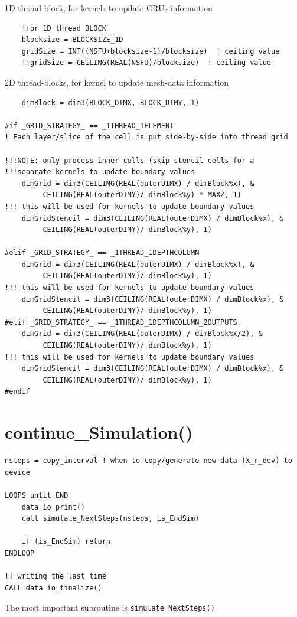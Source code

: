 1D thread-block, for kernels to update CRUs information
\begin{lstlisting}
    !for 1D thread BLOCK
    blocksize = BLOCKSIZE_1D
    gridSize = INT((NSFU+blocksize-1)/blocksize)  ! ceiling value
    !!gridSize = CEILING(REAL(NSFU)/blocksize)  ! ceiling value
\end{lstlisting}

2D thread-blocks, for kernel to update mesh-data information
\begin{lstlisting}
    dimBlock = dim3(BLOCK_DIMX, BLOCK_DIMY, 1)

#if _GRID_STRATEGY_ == _1THREAD_1ELEMENT
! Each layer/slice of the cell is put side-by-side into thread grid

!!!NOTE: only process inner cells (skip stencil cells for a
!!!separate kernels to update boundary values
    dimGrid = dim3(CEILING(REAL(outerDIMX) / dimBlock%x), & 
         CEILING(REAL(outerDIMY)/ dimBlock%y) * MAXZ, 1)
!!! this will be used for kernels to update boundary values
    dimGridStencil = dim3(CEILING(REAL(outerDIMX) / dimBlock%x), & 
         CEILING(REAL(outerDIMY)/ dimBlock%y), 1)
    
#elif _GRID_STRATEGY_ == _1THREAD_1DEPTHCOLUMN
    dimGrid = dim3(CEILING(REAL(outerDIMX) / dimBlock%x), & 
         CEILING(REAL(outerDIMY)/ dimBlock%y), 1)
!!! this will be used for kernels to update boundary values
    dimGridStencil = dim3(CEILING(REAL(outerDIMX) / dimBlock%x), & 
         CEILING(REAL(outerDIMY)/ dimBlock%y), 1)
#elif _GRID_STRATEGY_ == _1THREAD_1DEPTHCOLUMN_2OUTPUTS
    dimGrid = dim3(CEILING(REAL(outerDIMX) / dimBlock%x/2), & 
         CEILING(REAL(outerDIMY)/ dimBlock%y), 1)
!!! this will be used for kernels to update boundary values
    dimGridStencil = dim3(CEILING(REAL(outerDIMX) / dimBlock%x), & 
         CEILING(REAL(outerDIMY)/ dimBlock%y), 1)    
#endif    
\end{lstlisting}


\section{continue\_Simulation()}
\label{sec:continue_simulation}

\begin{lstlisting}
nsteps = copy_interval ! when to copy/generate new data (X_r_dev) to device

LOOPS until END
    data_io_print()
    call simulate_NextSteps(nsteps, is_EndSim)

    if (is_EndSim) return
ENDLOOP

!! writing the last time
CALL data_io_finalize()
\end{lstlisting}
The most important subroutine is \verb!simulate_NextSteps()!

